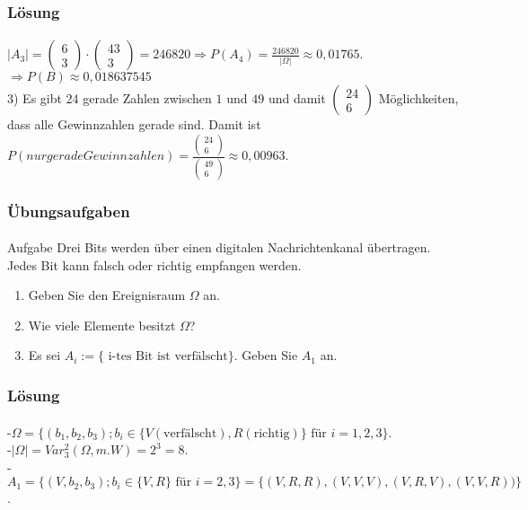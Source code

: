 \documentclass{beamer}
\begin{document}
\begin{frame}
    \frametitle{Lösung}
\framesubtitle{}
 $ | A_3 |  =  \begin{pmatrix} 
    6 \\ 3 \end{pmatrix} \cdot \begin{pmatrix} 
    43   \\ 3 \end{pmatrix} = 246820 \Rightarrow P(A_4) = \frac{246820}{|\Omega|}   \approx 0,01765$.
\\$\Rightarrow P(B) \approx 0,018637545$
\\3) Es gibt $24$ gerade Zahlen zwischen $1$ und $49$ und damit $ \begin{pmatrix} 
    24 \\ 6 \end{pmatrix}$ Möglichkeiten, dass alle Gewinnzahlen gerade sind. Damit ist $P(nur gerade Gewinnzahlen) = \frac{\begin{pmatrix} 
    24 \\ 6 \end{pmatrix}}{\begin{pmatrix} 
    49 \\ 6 \end{pmatrix}} \approx 0,00963$.
 \end{frame}



\begin{frame}
    \frametitle{Übungsaufgaben}
\framesubtitle{}
\begin{block}{Aufgabe}
Drei Bits werden über einen digitalen Nachrichtenkanal übertragen. Jedes Bit kann falsch oder richtig empfangen werden.
\begin{enumerate}
\item Geben Sie den Ereignisraum $\Omega$ an.
\item Wie viele Elemente besitzt $\Omega$?
\item Es sei $A_i := \{ \text{ i-tes Bit ist verfälscht}\}$. Geben Sie $A_1$ an.
\end{enumerate}
\end{block}

 \end{frame}

\begin{frame}
    \frametitle{Lösung}
\framesubtitle{}
-$\Omega = \{ (b_1, b_2, b_3);  b_i \in \{ V (\text{verfälscht}), R (\text{richtig}) \} \text{ für } i = 1,2,3 \}$.
\\-$| \Omega | = Var_3^2(\Omega, m.W) =  2^3 = 8$.
\\- $A_1 = \{ (V, b_2, b_3);  b_i \in \{ V,R  \}  \text{ für } i =2,3 \} = \{ (V,R,R), (V,V,V), (V,R,V), (V,V,R) ) \}$.
 \end{frame}
\end{document}
